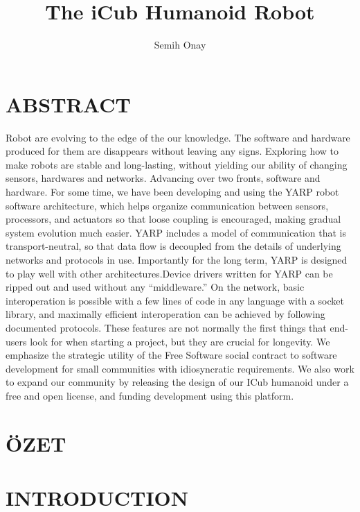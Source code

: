 \documentclass[a4paper, 11pt]{report}
\title{The iCub Humanoid Robot}
\author{Semih Onay}
\makeatletter
\renewcommand\tableofcontents{
  \hfill\textbf{\Large\contentsname}\hfill\null\par
  \@mkboth{\MakeUppercase\contentsname}{\MakeUppercase\contentsname}%
  \@starttoc{toc}
}
\makeatother
\begin{document}
  \makecstitle
  \tableofcontents
  \listoffigures
  
  \begin{symabbreviations}
    \sym{}{} 
  \end{symabbreviations}
  
{\tiny}\chapter{ABSTRACT}
Robot are evolving to the edge of the our knowledge. The software and hardware 
produced for them are disappears without leaving any signs. Exploring how to 
make robots are stable and long-lasting, without yielding our ability of 
changing sensors, hardwares and networks. Advancing over two fronts, software 
and hardware. For some time, we have been developing and using the YARP robot 
software architecture, which helps 
organize communication between sensors, processors, and actuators so that 
loose coupling is encouraged, making gradual system evolution much easier. YARP 
includes a model of communication that is transport-neutral, so that data 
flow is decoupled from the details of underlying networks and protocols in use. 
Importantly for the long term, YARP is designed to play well with other 
architectures.\linebreak Device drivers written for YARP can be ripped out and 
used without any “middleware.” On the network, basic interoperation is possible 
with a few lines of code in any language with a socket library, and maximally 
efficient interoperation can be achieved by following documented protocols. 
These features are not normally the first things that end-users look for when 
starting a project, but they are crucial for longevity.
We emphasize the strategic utility of the Free Software social contract to 
software development for small communities with idiosyncratic requirements. 
We also work to expand our community by releasing the design of our ICub 
humanoid under a free and open license, and funding development using this 
platform.
  
{\tiny}\chapter{ÖZET}

{\tiny}\chapter{INTRODUCTION}
  
\end{document}
